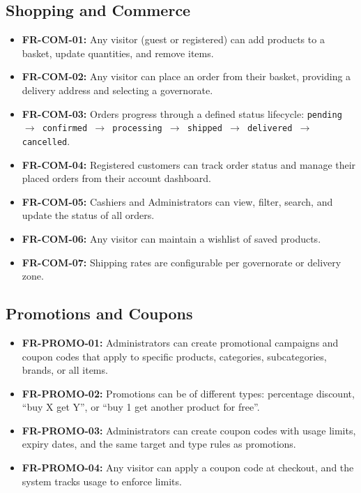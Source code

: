 \subsection{Shopping and Commerce}

\begin{itemize}
    \item \textbf{FR-COM-01:} Any visitor (guest or registered) can add products to a basket, update quantities, and remove items.
    \item \textbf{FR-COM-02:} Any visitor can place an order from their basket, providing a delivery address and selecting a governorate.
    \item \textbf{FR-COM-03:} Orders progress through a defined status lifecycle: \texttt{pending $\rightarrow$ confirmed $\rightarrow$ processing $\rightarrow$ shipped $\rightarrow$ delivered $\rightarrow$ cancelled}.
    \item \textbf{FR-COM-04:} Registered customers can track order status and manage their placed orders from their account dashboard.
    \item \textbf{FR-COM-05:} Cashiers and Administrators can view, filter, search, and update the status of all orders.
    \item \textbf{FR-COM-06:} Any visitor can maintain a wishlist of saved products.
    \item \textbf{FR-COM-07:} Shipping rates are configurable per governorate or delivery zone.
\end{itemize}

\subsection{Promotions and Coupons}

\begin{itemize}
    \item \textbf{FR-PROMO-01:} Administrators can create promotional campaigns and coupon codes that apply to specific products, categories, subcategories, brands, or all items.
    \item \textbf{FR-PROMO-02:} Promotions can be of different types: percentage discount, ``buy X get Y'', or ``buy 1 get another product for free''.
    \item \textbf{FR-PROMO-03:} Administrators can create coupon codes with usage limits, expiry dates, and the same target and type rules as promotions.
    \item \textbf{FR-PROMO-04:} Any visitor can apply a coupon code at checkout, and the system tracks usage to enforce limits.
\end{itemize}

